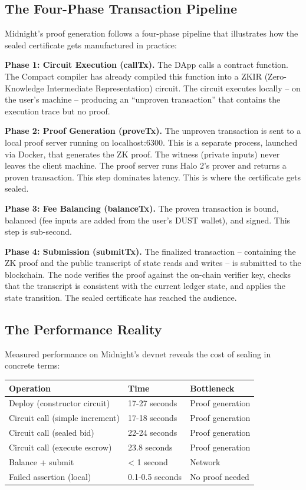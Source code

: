 \documentclass[
  11pt,
  openany]{report}
\renewcommand{\textbf}[1]{{\bfseries\color{MidnightBold}#1}}
\begin{document}
\subsection{The Four-Phase Transaction
Pipeline}\label{the-four-phase-transaction-pipeline}

Midnight's proof generation follows a four-phase pipeline that illustrates how
the sealed certificate gets manufactured in practice:

\textbf{Phase 1: Circuit Execution (callTx).} The DApp calls a contract
function. The Compact compiler has already compiled this function into a ZKIR
(Zero-Knowledge Intermediate Representation) circuit. The circuit executes
locally -- on the user's machine -- producing an ``unproven transaction'' that
contains the execution trace but no proof.

\textbf{Phase 2: Proof Generation (proveTx).} The unproven transaction is sent
to a local proof server running on localhost:6300. This is a separate process,
launched via Docker, that generates the ZK proof. The witness (private inputs)
never leaves the client machine. The proof server runs Halo 2's prover and
returns a proven transaction. This step dominates latency. This is where the
certificate gets sealed.

\textbf{Phase 3: Fee Balancing (balanceTx).} The proven transaction is bound,
balanced (fee inputs are added from the user's DUST wallet), and signed. This
step is sub-second.

\textbf{Phase 4: Submission (submitTx).} The finalized transaction -- containing
the ZK proof and the public transcript of state reads and writes -- is submitted
to the blockchain. The node verifies the proof against the on-chain verifier
key, checks that the transcript is consistent with the current ledger state, and
applies the state transition. The sealed certificate has reached the audience.

\subsection{The Performance Reality}\label{the-performance-reality}

Measured performance on Midnight's devnet reveals the cost of sealing in
concrete terms:

\begin{longtable}[]{@{}lll@{}}
\toprule\noalign{}
Operation & Time & Bottleneck \\
\midrule\noalign{}
\arrayrulecolor{MidnightBlue}\midrule\arrayrulecolor{MidnightBorder}
\endhead
\bottomrule\noalign{}
\endlastfoot
Deploy (constructor circuit) & 17-27 seconds & Proof generation \\
Circuit call (simple increment) & 17-18 seconds & Proof generation \\
Circuit call (sealed bid) & 22-24 seconds & Proof generation \\
Circuit call (execute escrow) & 23.8 seconds & Proof generation \\
Balance + submit & \textless{} 1 second & Network \\
Failed assertion (local) & 0.1-0.5 seconds & No proof needed \\
\end{longtable}
\end{document}
